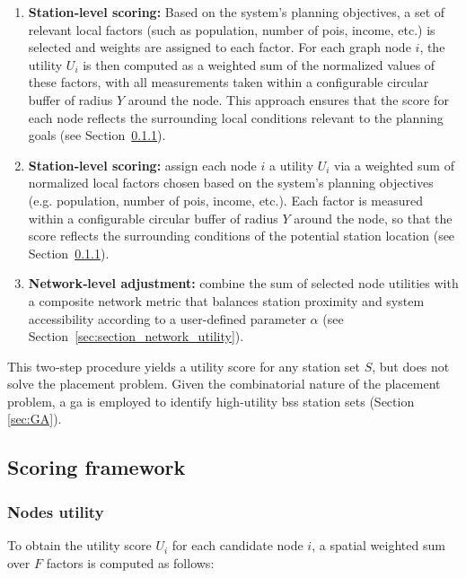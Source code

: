     \begin{enumerate}
        \item \textbf{Station‐level scoring:} Based on the system's planning objectives, a set of relevant local factors (such as population, number of \acp{poi}, income, etc.) is selected and weights are assigned to each factor. For each graph node \(i\), the utility \(U_i\) is then computed as a weighted sum of the normalized values of these factors, with all measurements taken within a configurable circular buffer of radius $Y$ around the node. This approach ensures that the score for each node reflects the surrounding local conditions relevant to the planning goals (see Section~\ref{sec:section_nodes_utility}).
        
        \item \textbf{Station‐level scoring:} assign each node \(i\) a utility \(U_i\) via a weighted sum of normalized local factors chosen based on the system's planning objectives (e.g. population, number of \acp{poi}, income, etc.). Each factor is measured within a configurable circular buffer of radius $Y$ around the node, so that the score reflects the surrounding conditions of the potential station location (see Section~\ref{sec:section_nodes_utility}).

        \item \textbf{Network‐level adjustment:} combine the sum of selected node utilities with a composite network metric that balances station proximity and system accessibility according to a user-defined parameter $\alpha$ (see Section~\ref{sec:section_network_utility}).
    \end{enumerate}

    This two‐step procedure yields a utility score for any station set $S$, but does not solve the placement problem. Given the combinatorial nature of the placement problem, a \ac{ga} is employed to identify high-utility \ac{bss} station sets (Section \ref{sec:GA}).

    \subsection{Scoring framework}
        
        \subsubsection{Nodes utility} \label{sec:section_nodes_utility}

        To obtain the utility score \(U_i\) for each candidate node \(i\), a spatial weighted sum over \(F\) factors is computed as follows:

